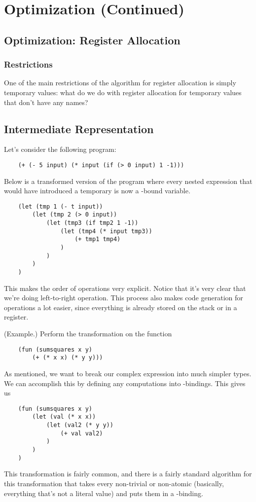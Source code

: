 \documentclass[letterpaper]{article}
\begin{document}
\section{Optimization (Continued)}

\subsection{Optimization: Register Allocation}

\subsubsection{Restrictions}
One of the main restrictions of the algorithm for register allocation is simply temporary values: what do we do with register allocation for temporary values that don't have any names?

\subsection{Intermediate Representation}
Let's consider the following program:
\begin{verbatim}
    (+ (- 5 input) (* input (if (> 0 input) 1 -1)))\end{verbatim}
Below is a transformed version of the program where every nested expression that would have introduced a temporary is now a -bound variable. 
\begin{verbatim}
    (let (tmp 1 (- t input))
        (let (tmp 2 (> 0 input))
            (let (tmp3 (if tmp2 1 -1))
                (let (tmp4 (* input tmp3))
                    (+ tmp1 tmp4)
                )
            )
        )
    )\end{verbatim}
This makes the order of operations very explicit. Notice that it's very clear that we're doing left-to-right operation. This process also makes code generation for operations a lot easier, since everything is already stored on the stack or in a register. 

\begin{mdframed}
    (Example.) Perform the transformation on the function 
    \begin{verbatim}
    (fun (sumsquares x y)
        (+ (* x x) (* y y)))\end{verbatim}

    \begin{mdframed}
        As mentioned, we want to break our complex expression into much simpler types. We can accomplish this by defining any computations into -bindings. This gives us 
        \begin{verbatim}
    (fun (sumsquares x y)
        (let (val (* x x))
            (let (val2 (* y y))
                (+ val val2)
            )
        )
    )\end{verbatim}
    \end{mdframed}
\end{mdframed}
This transformation is fairly common, and there is a fairly standard algorithm for this transformation that takes every non-trivial or non-atomic (basically, everything that's not a literal value) and puts them in a -binding. 
\end{document}
